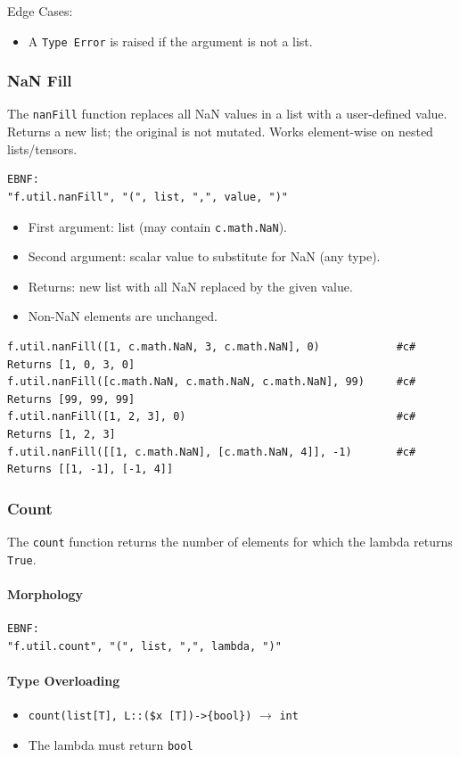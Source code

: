 Edge Cases:
\begin{itemize}
\item A \texttt{Type Error} is raised if the argument is not a list.
\end{itemize}

\subsubsection{NaN Fill}
The \texttt{nanFill} function replaces all NaN values in a list with a user-defined value. Returns a new list; the original is not mutated. Works element-wise on nested lists/tensors.
\begin{verbatim}
EBNF:
"f.util.nanFill", "(", list, ",", value, ")"
\end{verbatim}
\begin{itemize}
\item First argument: list (may contain \texttt{c.math.NaN}).
\item Second argument: scalar value to substitute for NaN (any type).
\item Returns: new list with all NaN replaced by the given value.
\item Non-NaN elements are unchanged.
\end{itemize}
\begin{verbatim}
f.util.nanFill([1, c.math.NaN, 3, c.math.NaN], 0)            #c# Returns [1, 0, 3, 0]
f.util.nanFill([c.math.NaN, c.math.NaN, c.math.NaN], 99)     #c# Returns [99, 99, 99]
f.util.nanFill([1, 2, 3], 0)                                 #c# Returns [1, 2, 3]
f.util.nanFill([[1, c.math.NaN], [c.math.NaN, 4]], -1)       #c# Returns [[1, -1], [-1, 4]]
\end{verbatim}

\subsubsection{Count}
The \texttt{count} function returns the number of elements for which the lambda returns \texttt{True}.

\paragraph{Morphology}
\begin{verbatim}
EBNF:
"f.util.count", "(", list, ",", lambda, ")"
\end{verbatim}

\paragraph{Type Overloading}
\begin{itemize}
\item \texttt{count(list[T], L::(\$x [T])->\{bool\})} $\rightarrow$ \texttt{int}
\item The lambda must return \texttt{bool}
\end{itemize}

